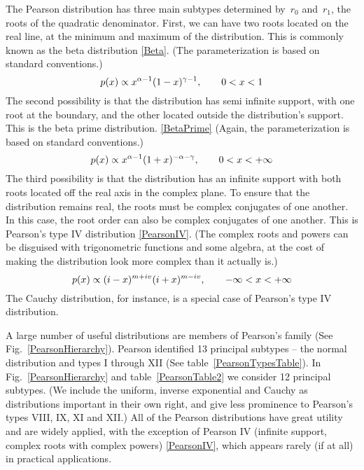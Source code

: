 The Pearson distribution has three main subtypes determined by~$r_0$ and~$r_1$, the roots of the quadratic denominator. First, we can have two roots located on the real line, at the minimum and maximum of the distribution. This is commonly known as the beta distribution \eqref{Beta}. (The parameterization is based on standard conventions.)
\[
p(x) \propto x^{\alpha-1} (1-x)^{\gamma-1}, \qquad 0<x<1 
\notag
\]
The second possibility is that the distribution has semi infinite support, with one root at the boundary, and the other located outside the distribution's support. This is the beta prime distribution.  \eqref{BetaPrime} (Again, the parameterization is based on standard conventions.)
\[
p(x) \propto x^{\alpha-1} (1+x)^{-\alpha-\gamma}, \qquad 0<x<+\infty
\notag
\checked
\]
The third possibility is that the distribution has an infinite support with both roots located off the real axis in the complex plane.  To ensure that the distribution remains real, the roots must be complex conjugates of one another. In this case, the root order can also be complex conjugates of one another. This is Pearson's type IV distribution \eqref{PearsonIV}. (The complex roots and powers can be disguised with trigonometric functions and some algebra, at the cost of making the distribution look more complex than it actually is.)
\[
p(x) \propto (i-x)^{m+iv} (i+x)^{m-iv}, \qquad -\infty <x<+ \infty 
\notag
\]
The Cauchy distribution, for instance, is a special case of Pearson's type IV distribution.





A large number of useful distributions are members of Pearson's family (See Fig.~\ref{PearsonHierarchy}). Pearson identified 13 principal subtypes -- the normal distribution and types I through XII (See table~\ref{PearsonTypesTable}). 
In Fig.~\ref{PearsonHierarchy} and table~\ref{PearsonTable2} we consider 12 principal subtypes. (We include the uniform, inverse exponential and Cauchy as distributions important in their own right, and give less prominence to Pearson's types VIII, IX, XI and XII.)
All of the Pearson distributions have great utility and are widely applied, with the exception of Pearson IV (infinite support, complex roots with complex powers) \eqref{PearsonIV}, which appears rarely (if at all) in practical applications. 

